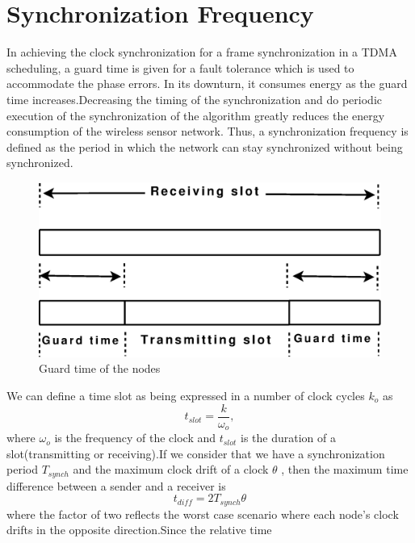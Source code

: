 \documentclass[a4paper,8pt]{report}
\begin{document}
\section{Synchronization Frequency}
In achieving the clock synchronization for a frame synchronization
in a TDMA scheduling, a guard time is given for a fault tolerance
which is used to accommodate the phase errors. In its downturn, it
consumes energy as the guard time increases.\newline Decreasing the
timing of the synchronization and do periodic execution of the
synchronization of the algorithm greatly reduces the energy
consumption of the wireless sensor network. Thus, a synchronization
frequency is defined as the period in which the network can stay
synchronized without being synchronized.
\begin{figure}
\centering
\includegraphics[width = 1 \textwidth]{guardtime}
\caption{Guard time of the nodes}
\label{guardtime}
\end{figure}
\newline We can define a time slot as being expressed in a
number of clock cycles $k_o$ as
\begin{equation}
t_{slot} = \frac{k}{\omega_o} ,
\end{equation} where $\omega_o$ is the frequency of the clock and
$t_{slot}$ is the duration of a slot(transmitting or
receiving).\newline If  we consider that we have a synchronization
period $T_{synch}$ and the maximum clock drift of a clock $\theta$ ,
then the maximum time difference between a sender and a receiver is
\begin{equation}
t_{diff} = 2T_{synch}\theta
\end{equation} where the factor of
two reflects the worst case scenario where each node's clock drifts
in the opposite direction.\newline Since the relative time
\end{document}
